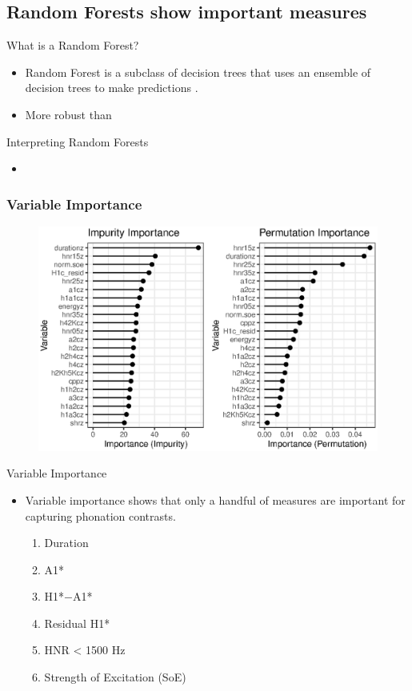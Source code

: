 \documentclass[professionalfont]{beamer}
\begin{document}
\subsection{Random Forests show important measures}

\begin{frame}{What is a Random Forest?}
  \begin{itemize}
    \item Random Forest is a subclass of decision trees that uses an ensemble of decision trees to make predictions \citep{breimanClassificationRegressionTrees1986,breimanBaggingPredictors1996,breimanRandomForests2001}.
    \item More robust than 
  \end{itemize}
\end{frame}

\begin{frame}{Interpreting Random Forests}
  \begin{itemize}
    \item 
  \end{itemize}
\end{frame}

\begin{frame}
  \frametitle{Variable Importance}
  \begin{figure}[h!]
    \centering
    \includegraphics[width = 0.8\linewidth]{images/RandomForest/rf_dur_plots.eps}
  \end{figure}
\end{frame}

\begin{frame}{Variable Importance}
  \begin{itemize}
    \item Variable importance shows that only a handful of measures are important for capturing phonation contrasts.
    \begin{enumerate}
      \item Duration
      \item A1*
		  \item H1*$-$A1*
      \item Residual H1*
		  \item HNR < 1500 Hz
		  \item Strength of Excitation (SoE)
    \end{enumerate} 
  \end{itemize}
\end{frame}
\end{document}
